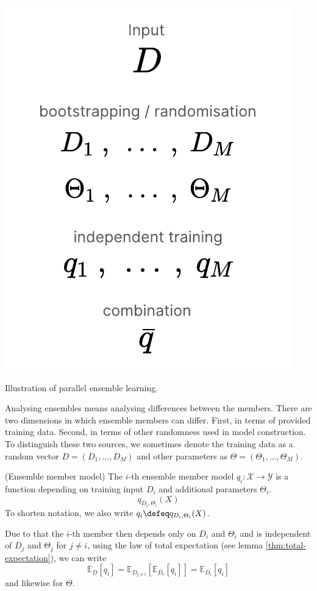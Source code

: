 \documentclass[
    a4paper, %
	fontsize=10pt, %
	twoside=false, %
]{kaobook}
\begin{document}
\begin{marginfigure}
  \includegraphics[width=\textwidth]{figma-illustrations/ensemble-learning.pdf}
  \caption{
    Illustration of parallel ensemble learning.
  }
\end{marginfigure}
Analysing ensembles means analysing differences between the members. There are two dimensions in which ensemble members can differ. First, in terms of provided training data. 
Second, in terms of other randomness used in model construction.
To distinguish these two sources, we sometimes denote the training data as a random vector $D = (D_{1}, \dots, D_{M})$ and other parameters as $\Theta = (\Theta_{1}, \dots, \Theta_{M})$. 
\begin{definition} (Ensemble member model) The $i$-th ensemble member model $q_{i}: \mathcal{X} \to \mathcal{Y}$ is a function depending on training input $D_{i}$ and additional parameters $\Theta_{i}$.
$$
q_{D_{i}, \Theta_{i}}(X)
$$
To shorten notation, we also write $q_{i} \defeq  q_{D_{i}, \Theta_{i}}(X)$.
\end{definition}
Due to that the $i$-th member then depends only on $D_{i}$ and $\Theta_{i}$ and is independent of $D_{j}$ and $\Theta_{j}$ for $j \not= i$, using the law of total expectation (see lemma \ref{thm:total-expectation}), we can write
$$
\mathbb{E}_{D}\left[ q_{i} \right] = \mathbb{E}_{D_{j \not= i}}\left[ \mathbb{E}_{D_{i}}\left[ q_{i} \right]   \right]  = \mathbb{E}_{D_{i}}\left[ q_{i} \right] 
$$
and likewise for $\Theta$. 
\end{document}
